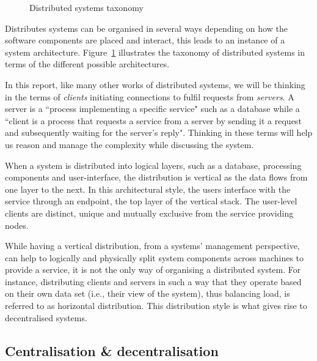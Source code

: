 \begin{figure}[ht]
    \centering
    
    \caption{Distributed systems taxonomy}
    \label{fig:distributed_taxonomy}
\end{figure}

Distributes systems can be organised in several ways depending on how the software components are placed and interact, this leads to an instance of a system architecture\cite{bass2003architecture}. Figure~\ref{fig:distributed_taxonomy} illustrates the taxonomy of distributed systems in terms of the different possible architectures.

In this report, like many other works of distributed systems, we will be thinking in the terms of \textit{clients} initiating connections to fulfil requests from \textit{servers}. A server is a ``process implementing a specific service" such as a database while a ``client is a process that requests a service from a server by sending it a request and subsequently waiting for the server’s reply". Thinking in these terms will help us reason and manage the complexity while discussing the system.\cite{tanenbaum2007distributed}

When a system is distributed into logical layers, such as a database, processing components and user-interface, the distribution is vertical as the data flows from one layer to the next\cite{tanenbaum2007distributed}. In this architectural style, the users interface with the service through an endpoint, the top layer of the vertical stack. The user-level clients are distinct, unique and mutually exclusive from the service providing nodes.

While having a vertical distribution, from a systems' management perspective, can help to logically and physically split system components across machines to provide a service, it is not the only way of organising a distributed system. For instance, distributing clients and servers in such a way that they operate based on their own data set (i.e., their view of the system), thus balancing load, is referred to as horizontal distribution. This distribution style is what gives rise to decentralised systems.\cite{tanenbaum2007distributed}

\subsection{Centralisation \& decentralisation}
\label{subsec:centralisationVsDecentralisation}


